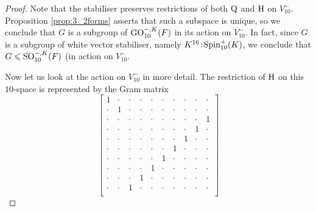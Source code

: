 \begin{proof}
	Note that the stabiliser preserves restrictions of both $\mathord{\mathrm{Q}}$ and $\mathrm{H}$ on $V_{10}^-$. Proposition
	\ref{prop:3_2forms} asserts that such a subspace is unique, so we conclude that $G$ is 
	a subgroup of $\mathrm{GO}_{10}^{-,K}(F)$ in its action on $V_{10}^-$. In fact, since $G$ is a 
	subgroup of white vector stabiliser, namely $K^{16}\mathord{{\;\!{:}\;\!}}\mathrm{Spin}_{10}^+(K)$, we conclude that 
	$G \leqslant \mathrm{SO}_{10}^{-,K}(F)$ (in action on $V_{10}^-$. 
	
	Now let us look at the action on $V_{10}^{-}$ in more detail. The restriction of $\mathrm{H}$ on
	this $10$-space is represented by the Gram matrix
	\begin{equation*}
		\begin{bmatrix}
			1 & \cdot & \cdot & \cdot & \cdot & \cdot & \cdot & \cdot & \cdot & \cdot \\
			\cdot & 1 & \cdot & \cdot & \cdot & \cdot & \cdot & \cdot & \cdot & \cdot \\
			\cdot & \cdot & \cdot & \cdot & \cdot & \cdot & \cdot & \cdot & \cdot & 1 \\
			\cdot & \cdot & \cdot & \cdot & \cdot & \cdot & \cdot & \cdot & 1 & \cdot \\
			\cdot & \cdot & \cdot & \cdot & \cdot & \cdot & \cdot & 1 & \cdot & \cdot \\
			\cdot & \cdot & \cdot & \cdot & \cdot & \cdot & 1 & \cdot & \cdot & \cdot \\
			\cdot & \cdot & \cdot & \cdot & \cdot & 1 & \cdot & \cdot & \cdot & \cdot \\
			\cdot & \cdot & \cdot & \cdot & 1 & \cdot & \cdot & \cdot & \cdot & \cdot \\
			\cdot & \cdot & \cdot & 1 & \cdot & \cdot & \cdot & \cdot & \cdot & \cdot \\
			\cdot & \cdot & 1 & \cdot & \cdot & \cdot & \cdot & \cdot & \cdot & \cdot \\
		\end{bmatrix}
	\end{equation*}

\end{proof}
